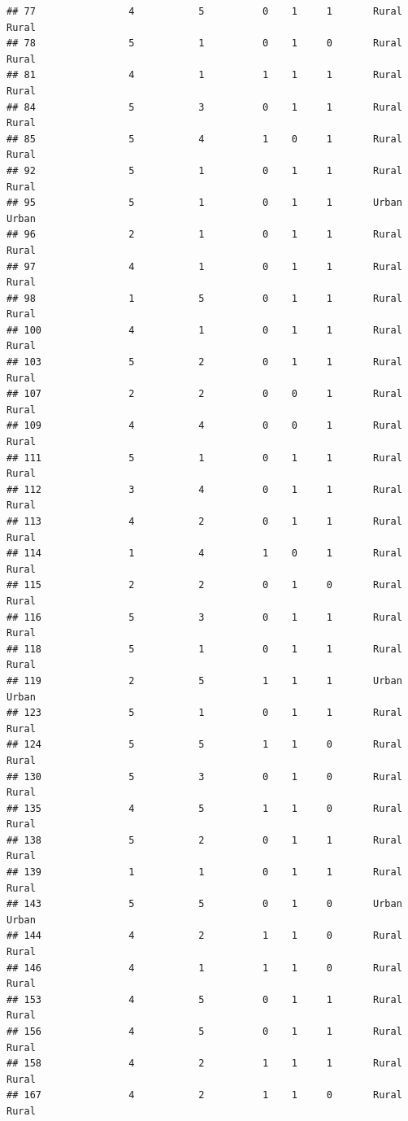 \documentclass[
]{article}
\begin{document}
\begin{verbatim}
## 77                4           5          0    1     1       Rural Rural
## 78                5           1          0    1     0       Rural Rural
## 81                4           1          1    1     1       Rural Rural
## 84                5           3          0    1     1       Rural Rural
## 85                5           4          1    0     1       Rural Rural
## 92                5           1          0    1     1       Rural Rural
## 95                5           1          0    1     1       Urban Urban
## 96                2           1          0    1     1       Rural Rural
## 97                4           1          0    1     1       Rural Rural
## 98                1           5          0    1     1       Rural Rural
## 100               4           1          0    1     1       Rural Rural
## 103               5           2          0    1     1       Rural Rural
## 107               2           2          0    0     1       Rural Rural
## 109               4           4          0    0     1       Rural Rural
## 111               5           1          0    1     1       Rural Rural
## 112               3           4          0    1     1       Rural Rural
## 113               4           2          0    1     1       Rural Rural
## 114               1           4          1    0     1       Rural Rural
## 115               2           2          0    1     0       Rural Rural
## 116               5           3          0    1     1       Rural Rural
## 118               5           1          0    1     1       Rural Rural
## 119               2           5          1    1     1       Urban Urban
## 123               5           1          0    1     1       Rural Rural
## 124               5           5          1    1     0       Rural Rural
## 130               5           3          0    1     0       Rural Rural
## 135               4           5          1    1     0       Rural Rural
## 138               5           2          0    1     1       Rural Rural
## 139               1           1          0    1     1       Rural Rural
## 143               5           5          0    1     0       Urban Urban
## 144               4           2          1    1     0       Rural Rural
## 146               4           1          1    1     0       Rural Rural
## 153               4           5          0    1     1       Rural Rural
## 156               4           5          0    1     1       Rural Rural
## 158               4           2          1    1     1       Rural Rural
## 167               4           2          1    1     0       Rural Rural

\end{verbatim}
\end{document}
